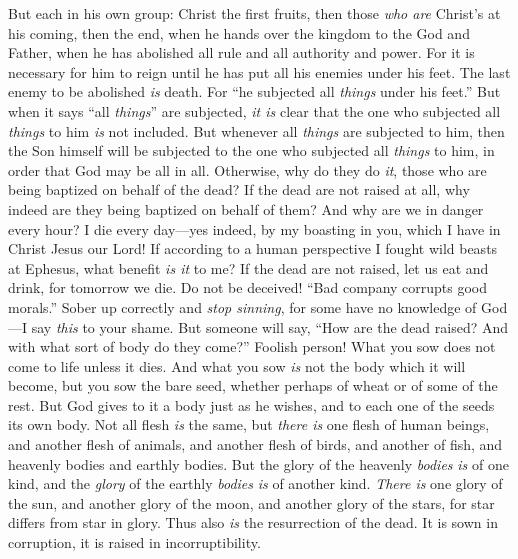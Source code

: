 \begin{biblechapter}
\verse But each in his own group: Christ the first fruits, then those \textit{who are} Christ’s at his coming,
\verse then the end, when he hands over the kingdom to the God and Father, when he has abolished all rule and all authority and power.
\verse For it is necessary for him to reign until he has put all his enemies under his feet.
\verse The last enemy to be abolished \textit{is} death.
\verse For “he subjected all \textit{things} under his feet.” But when it says “all \textit{things}” are subjected, \textit{it is} clear that the one who subjected all \textit{things} to him \textit{is} not included.
\verse But whenever all \textit{things} are subjected to him, then the Son himself will be subjected to the one who subjected all \textit{things} to him, in order that God may be all in all.
\verse Otherwise, why do they do \textit{it}, those who are being baptized on behalf of the dead? If the dead are not raised at all, why indeed are they being baptized on behalf of them?
\verse And why are we in danger every hour?
\verse I die every day—yes indeed, by my boasting in you, which I have in Christ Jesus our Lord!
\verse If according to a human perspective I fought wild beasts at Ephesus, what benefit \textit{is it} to me? If the dead are not raised, let us eat and drink, for tomorrow we die.
\verse Do not be deceived! “Bad company corrupts good morals.”
\verse Sober up correctly and \textit{stop sinning}, for some have no knowledge of God—I say \textit{this} to your shame.
 But someone will say, “How are the dead raised? And with what sort of body do they come?”
\verse Foolish person! What you sow does not come to life unless it dies.
\verse And what you sow \textit{is} not the body which it will become, but you sow the bare seed, whether perhaps of wheat or of some of the rest.
\verse But God gives to it a body just as he wishes, and to each one of the seeds its own body.
\verse Not all flesh \textit{is} the same, but \textit{there is} one flesh of human beings, and another flesh of animals, and another flesh of birds, and another of fish,
\verse and heavenly bodies and earthly bodies. But the glory of the heavenly \textit{bodies} \textit{is} of one kind, and the \textit{glory} of the earthly \textit{bodies} \textit{is} of another kind.
\verse \textit{There is} one glory of the sun, and another glory of the moon, and another glory of the stars, for star differs from star in glory.
\verse Thus also \textit{is} the resurrection of the dead. It is sown in corruption, it is raised in incorruptibility.

\end{biblechapter}
